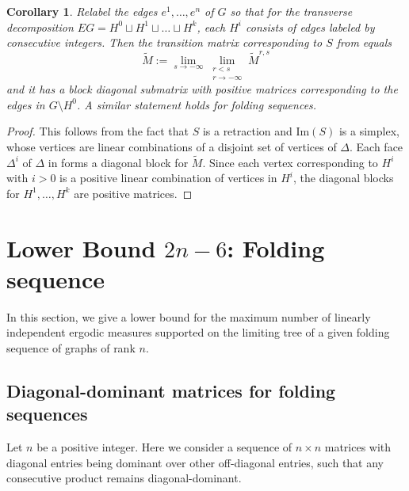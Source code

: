 \documentclass[11pt, letterpaper]{amsart}
\theoremstyle{plain}
\newtheorem{corollary}[theorem]{Corollary}
\theoremstyle{definition}
\newcommand{\wt}[1]{\widetilde{#1}}
\begin{document}
\begin{corollary}\label{cor:normalized_diagonal}
  Relabel the edges $e^1,\ldots,e^n$ of $G$ so that for the transverse decomposition
  $EG=H^0\sqcup H^1 \sqcup \ldots \sqcup H^k$, each $H^i$ consists of edges labeled by
  consecutive integers. Then the transition matrix corresponding to $S$ from
   equals
  \[
    \wt{M}:=\lim_{s \to -\infty}\lim_{\substack{r<s\\ r\to -\infty}}\wt{M}^{r,s}
  \]
  and it has a block diagonal submatrix with positive matrices corresponding to the
  edges in $G \setminus H^0$. A similar statement holds for folding sequences.
  \end{corollary}

  \begin{proof}
    This follows from the fact that $S$ is a retraction and $\textrm{Im}(S)$ is a simplex, whose
    vertices are linear combinations of a disjoint set of vertices of $\Delta$.
    Each face $\Delta^i$ of $\Delta$
    in  forms a diagonal block for
    $\wt{M}$. Since each vertex corresponding to $H^i$ with $i>0$ is a positive
    linear combination of vertices in $H^i$, the diagonal blocks for $H^1,\ldots,H^k$ are positive matrices.
    \end{proof}


\section{Lower Bound $2n-6$:  Folding sequence}  \label{sec:lowerbound}
In this section, we give a lower bound for the maximum number of linearly independent ergodic measures supported on the limiting tree of a given folding sequence of graphs of rank $n$.

\subsection{Diagonal-dominant matrices for folding sequences}
\label{ssec:ddmatrix_folding}

Let $n$ be a positive integer. Here we consider a sequence of $n \times n$
matrices with diagonal entries being dominant over other off-diagonal entries,
such that any consecutive product remains diagonal-dominant. 
\end{document}
